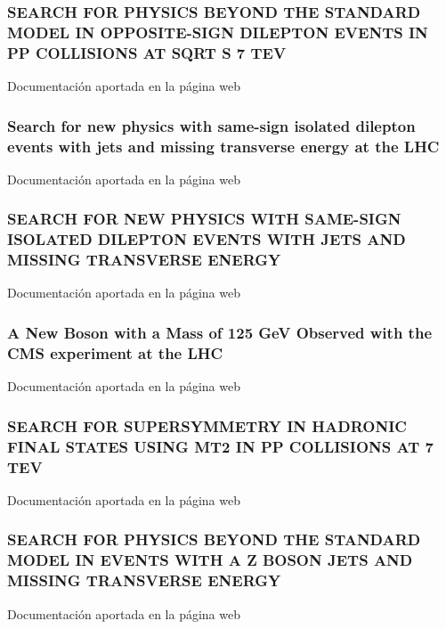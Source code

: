 \documentclass[a4paper, 11pt, twoside, openright]{report}
\begin{document}
\subsubsection{SEARCH FOR PHYSICS BEYOND THE STANDARD MODEL IN OPPOSITE-SIGN DILEPTON EVENTS IN PP COLLISIONS AT SQRT S 7 TEV}
Documentación aportada en la página web
%
\subsubsection{Search for new physics with same-sign isolated dilepton events with jets and missing transverse energy at the LHC}
Documentación aportada en la página web
%
\subsubsection{SEARCH FOR NEW PHYSICS WITH SAME-SIGN ISOLATED DILEPTON EVENTS WITH JETS AND MISSING TRANSVERSE ENERGY}
Documentación aportada en la página web
%
\subsubsection{A New Boson with a Mass of 125 GeV Observed with the CMS experiment at the LHC}
Documentación aportada en la página web
%
\subsubsection{SEARCH FOR SUPERSYMMETRY IN HADRONIC FINAL STATES USING MT2 IN PP COLLISIONS AT 7 TEV}
Documentación aportada en la página web
%
\subsubsection{SEARCH FOR PHYSICS BEYOND THE STANDARD MODEL IN EVENTS WITH A Z BOSON JETS AND MISSING TRANSVERSE ENERGY}
Documentación aportada en la página web
%
\end{document}
